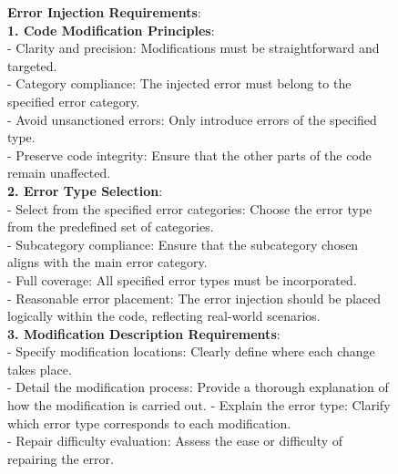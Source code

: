 \documentclass[11pt, a4paper, logo, copyright, nonumbering, amsart]{map}
\begin{document}
\begin{CJK*}{UTF8}{gbsn}
\begin{figure*}[h!]
\begin{center}
\begin{tcolorbox}[width=1\textwidth, colback=lightblue, title={\textbf{Insert Bug Prompt}}]
    \textbf{Error Injection Requirements}:\\
    \textbf{1. Code Modification Principles}:\\
    - Clarity and precision: Modifications must be straightforward and targeted.\\
    - Category compliance: The injected error must belong to the specified error category.\\
    - Avoid unsanctioned errors: Only introduce errors of the specified type.\\
    - Preserve code integrity: Ensure that the other parts of the code remain unaffected.\\
    \textbf{2. Error Type Selection}:\\
    - Select from the specified error categories: Choose the error type from the predefined set of categories.\\
    - Subcategory compliance: Ensure that the subcategory chosen aligns with the main error category.\\
    - Full coverage: All specified error types must be incorporated.\\
    - Reasonable error placement: The error injection should be placed logically within the code, reflecting real-world scenarios.\\
    \textbf{3. Modification Description Requirements}:\\
    - Specify modification locations: Clearly define where each change takes place.\\
    - Detail the modification process: Provide a thorough explanation of how the modification is carried out.
    - Explain the error type: Clarify which error type corresponds to each modification.\\
    - Repair difficulty evaluation: Assess the ease or difficulty of repairing the error.\\
    

\end{tcolorbox}
\end{center}
\end{figure*}
\end{CJK*}
\end{document}
